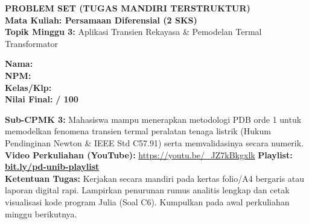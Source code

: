 \documentclass[10pt,a4paper]{article}
\begin{document}
\noindent\begin{minipage}[c]{0.68\textwidth}%
  {\large\textbf{\color{unibblue}PROBLEM SET (TUGAS MANDIRI TERSTRUKTUR)}}\\[1mm]
  {\normalsize\textbf{Mata Kuliah: Persamaan Diferensial (2 SKS)}}\\[0.5mm]
  {\small\textbf{Topik Minggu 3:} Aplikasi Transien Rekayasa \& Pemodelan Termal Transformator}%
\end{minipage}%
\hfill%
\begin{minipage}[c]{0.30\textwidth}%
  \begin{tcolorbox}[colback=unibblue!5,colframe=unibblue,boxrule=0.6pt,arc=2pt,left=4pt,right=4pt,top=2pt,bottom=2pt]
    \scriptsize
    \textbf{Nama:} \dotfill\\[1.2mm]
    \textbf{NPM:} \dotfill\\[1.2mm]
    \textbf{Kelas/Klp:} \dotfill\\[1.2mm]
    \textbf{Nilai Final:} \hfill \textbf{/ 100}
  \end{tcolorbox}%
\end{minipage}\par

\vspace{1.5mm}

\begin{tcolorbox}[colback=boxbg,colframe=unibgold!90!black,boxrule=0.6pt,arc=2pt,left=5pt,right=5pt,top=3pt,bottom=3pt,title=\textbf{\scriptsize Capaian Pembelajaran (Sub-CPMK 3) \& Pedoman Pengerjaan Tugas}]
  \scriptsize
  \textbf{Sub-CPMK 3:} Mahasiswa mampu menerapkan metodologi PDB orde 1 untuk memodelkan fenomena transien termal peralatan tenaga listrik (Hukum Pendinginan Newton \& IEEE Std C57.91) serta memvalidasinya secara numerik.\\
  \textbf{Video Perkuliahan (YouTube):} \url{https://youtu.be/_JZ7kBkgxlk} \hfill \textbf{Playlist:} \href{https://www.youtube.com/playlist?list=PLS5oOZWXZeTw}{\color{unibblue}\textbf{bit.ly/pd-unib-playlist}}\\\textbf{Ketentuan Tugas:} Kerjakan secara mandiri pada kertas folio/A4 bergaris atau laporan digital rapi. Lampirkan penurunan rumus analitis lengkap dan cetak visualisasi kode program Julia (Soal C6). Kumpulkan pada awal perkuliahan minggu berikutnya.
\end{tcolorbox}

\vspace{1.5mm}
\end{document}
